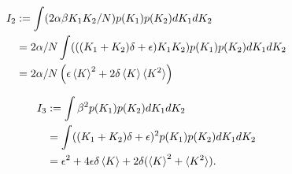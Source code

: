 \documentclass{article}
\begin{document}
\begin{align}
    I_2 &:= \int (2\alpha \beta K_1 K_2/N) p(K_1) p(K_2) dK_1 dK_2\\
    &= 2\alpha/N \int (((K_1+K_2)\delta + \epsilon) K_1 K_2) p(K_1) p(K_2) dK_1 dK_2\\
    &=2\alpha/N \left ( \epsilon \braket{K}^2 + 2 \delta \braket{K}\braket{K^2} \right )
\end{align}

\begin{align}
    I_3 &:= \int \beta^2 p(K_1) p(K_2) dK_1 dK_2\\
    &= \int ((K_1+K_2)\delta + \epsilon)^2 p(K_1) p(K_2) dK_1 dK_2\\
    &= \epsilon^2 + 4 \epsilon \delta \braket{K} + 2 \delta (\braket{K}^2 + \braket{K^2}).
\end{align}
\end{document}
